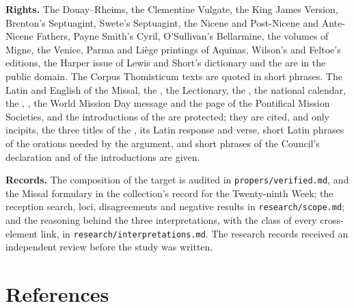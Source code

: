 {\textbf{Rights.} The Douay--Rheims, the Clementine Vulgate, the King James
Version, Brenton's Septuagint, Swete's Septuagint, the Nicene and Post-Nicene
and Ante-Nicene Fathers, Payne Smith's Cyril, O'Sullivan's Bellarmine, the
volumes of Migne, the Venice, Parma and Li\`ege printings of Aquinas,
Wilson's and Feltoe's editions, the Harper issue of Lewis and Short's
dictionary and the  are in the public domain. The
Corpus Thomisticum texts are quoted in short phrases. The Latin and English of
the Missal, the , the Lectionary, the
, the national calendar, the ,
, the World Mission Day message and the page of the
Pontifical Mission Societies, and the introductions of the  are protected; they are cited, and
only incipits, the three titles of the , its Latin response and
verse, short Latin phrases of the orations needed by the argument, and short
phrases of the Council's declaration and of the introductions are given.

\textbf{Records.} The composition of the target is audited in
\texttt{propers/verified.md}, and the Missal formulary in the collection's
record for the Twenty-ninth Week; the reception search, loci, disagreements and
negative results in \texttt{research/scope.md}; and the reasoning behind the
three interpretations, with the class of every cross-element link, in
\texttt{research/interpretations.md}. The research records received an
independent review before the study was written.
\par}

\section*{References}
\label{sec:references}


